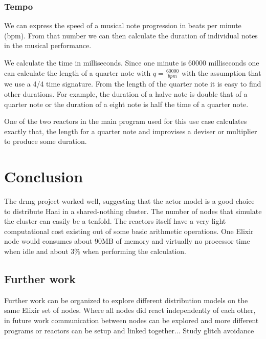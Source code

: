 \documentclass[a4paper]{book}
\begin{document}
\subsection*{Tempo}
We can express the speed of a musical note progression in beats per minute (bpm). From that number we can then calculate the duration of individual notes in the musical performance. 

We calculate the time in milliseconds. Since one minute is 60000 milliseconds one can calculate the length of a quarter note with \(q = \frac{60000}{bpm}\) with the assumption that we use a 4/4 time signature. From the length of the quarter note it is easy to find other durations. For example, the duration of a halve note is double that of a quarter note or the duration of a eight note is half the time of a quarter note.

One of the two reactors in the main program used for this use case calculates exactly that, the length for a quarter note and improvises a deviser or multiplier to produce some duration. 


\backmatter
\chapter{Conclusion}
The drmg project worked well, suggesting that the actor model is a good choice to distribute Haai in a shared-nothing cluster. The number of nodes that simulate the cluster can easily be a tenfold. The reactors itself have a very light computational cost existing out of some basic arithmetic operations. One Elixir node would consumes about 90MB of memory and virtually no processor time when idle and about 3\% when performing the calculation.

\section*{Further work}
Further work can be organized to explore different distribution models on the same Elixir set of nodes. Where all nodes did react independently of each other, in future work communication between nodes can be explored and more different programs or reactors can be setup and linked together...
Study glitch avoidance 

\printbibliography
\end{document}
